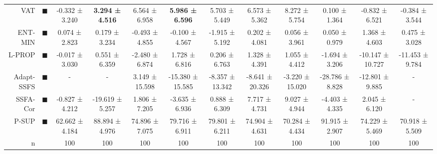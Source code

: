\begin{tabular}{rccccccccccc}
VAT        &                                \textcolor{VAT}{\LARGE $\blacksquare$} &          -0.332 ± 3.240 &  \textbf{3.294 ± 4.516} &            6.564 ± 6.958 &  \textbf{5.986 ± 6.596} &           5.703 ± 5.449 &            6.573 ± 5.362 &            8.272 ± 5.754 &           0.100 ± 1.364 &          -0.832 ± 6.521 &          -0.384 ± 3.544 \\
ENT-MIN    &               \textcolor{ENTROPY_MINIMISATION}{\LARGE $\blacksquare$} &           0.074 ± 2.823 &           0.179 ± 3.234 &           -0.493 ± 4.855 &          -0.100 ± 4.567 &          -1.915 ± 5.192 &            0.202 ± 4.081 &            0.056 ± 3.961 &           0.050 ± 0.979 &           1.368 ± 4.603 &           0.475 ± 3.028 \\
L-PROP     &                  \textcolor{LABEL_PROPAGATION}{\LARGE $\blacksquare$} &          -0.017 ± 3.030 &           0.551 ± 6.359 &           -2.480 ± 6.874 &           1.728 ± 6.816 &           0.206 ± 6.763 &            1.328 ± 4.391 &            1.055 ± 4.412 &          -1.694 ± 3.206 &        -10.147 ± 10.727 &         -11.453 ± 9.784 \\
Adapt-SSFS &                           \textcolor{ASSFSCMR}{\LARGE $\blacksquare$} &                       - &                       - &           3.149 ± 15.598 &        -15.380 ± 15.585 &         -8.357 ± 13.342 &          -8.641 ± 20.326 &          -3.220 ± 15.020 &         -28.786 ± 8.828 &         -12.801 ± 9.885 &                       - \\
SSFA-Cor   &                           \textcolor{SFAMCAMT}{\LARGE $\blacksquare$} &          -0.827 ± 4.212 &         -19.619 ± 5.257 &            1.806 ± 7.205 &          -3.635 ± 6.936 &           0.888 ± 6.309 &            7.717 ± 4.731 &            9.027 ± 4.944 &          -4.403 ± 4.335 &           2.045 ± 6.120 &                       - \\
P-SUP      &      \textcolor{PARTIAL_SUPERVISED_CLASSIFIER}{\LARGE $\blacksquare$} &          62.662 ± 4.184 &          88.894 ± 4.976 &           74.896 ± 7.075 &          79.716 ± 6.911 &          79.801 ± 6.211 &           74.904 ± 4.631 &           70.284 ± 4.434 &          91.915 ± 2.907 &          74.229 ± 5.469 &          70.918 ± 5.509 \\
n          &                                                                       &                     100 &                     100 &                      100 &                     100 &                     100 &                      100 &                      100 &                     100 &                     100 &                     100 \\
\bottomrule
\end{tabular}
